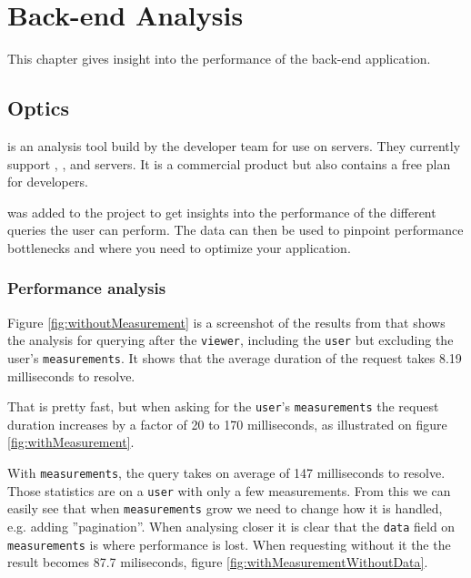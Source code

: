 \chapter{Back-end Analysis}
This chapter gives insight into the performance of the back-end application.

\section{Optics}
 is an analysis tool build by the  developer team for use on  servers. 
They currently support , ,  and  servers. 
It is a commercial product but also contains a free plan for developers.

 was added to the project to get insights into the performance of the different queries the user can perform. 
The data can then be used to pinpoint performance bottlenecks and where you need to optimize your application.

\subsection{Performance analysis}
Figure \ref{fig:withoutMeasurement} is a screenshot of the results from  that shows the analysis for querying after the \verb+viewer+, including the \verb+user+ but excluding the user's \verb+measurements+. 
It shows that the average duration of the request takes 8.19 milliseconds to resolve. 


That is pretty fast, but when asking for the \verb+user+'s \verb+measurements+ the request duration increases by a factor of 20 to 170 milliseconds, as illustrated on figure \ref{fig:withMeasurement}.


With \verb+measurements+, the query takes on average of 147 milliseconds to resolve.
Those statistics are on a \verb+user+ with only a few measurements.
From this we can easily see that when \verb+measurements+ grow we need to change how it is handled, e.g. adding ''pagination''. 
When analysing closer it is clear that the \verb+data+ field on \verb+measurements+ is where performance is lost.
When requesting without it the the result becomes 87.7 miliseconds, figure \ref{fig:withMeasurementWithoutData}.

